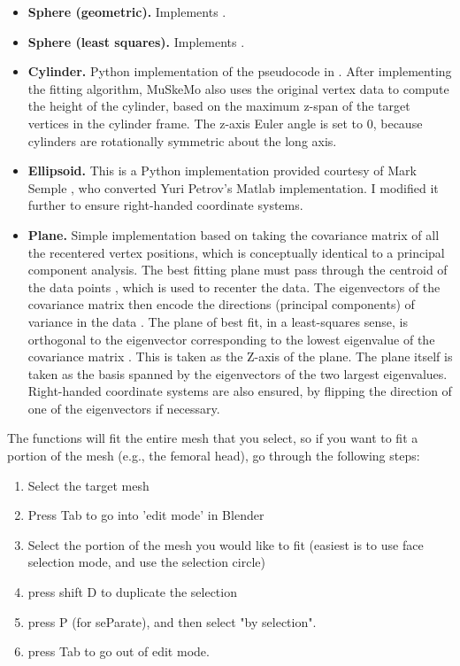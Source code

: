 \documentclass{article}
\begin{document}
\begin{itemize}
    \item \textbf{Sphere (geometric).} Implements \cite{yesudasanFastGeometricFit2015}.
    \item \textbf{Sphere (least squares).} Implements \cite{Jekel2016}.
    \item \textbf{Cylinder.} Python implementation of the pseudocode in \cite{eberlyLeastSquaresFitting}. After implementing the fitting algorithm, MuSkeMo also uses the original vertex data to compute the height of the cylinder, based on the maximum z-span of the target vertices in the cylinder frame. The z-axis Euler angle is set to 0, because cylinders are rotationally symmetric about the long axis.
    \item \textbf{Ellipsoid.} This is a Python implementation provided courtesy of Mark Semple \cite{semplePyEllipsoid_Fit}, who converted Yuri Petrov's Matlab implementation. I modified it further to ensure right-handed coordinate systems.
    \item \textbf{Plane.} Simple implementation based on taking the covariance matrix of all the recentered vertex positions, which is conceptually identical to a principal component analysis. The best fitting plane must pass through the centroid of the data points \cite{pearsonLIIILinesPlanes1901}, which is used to recenter the data. The eigenvectors of the covariance matrix then encode the directions (principal components) of variance in the data \cite{jolliffeMathematicalStatisticalProperties2002}. The plane of best fit, in a least-squares sense, is orthogonal to the eigenvector corresponding to the lowest eigenvalue of the covariance matrix \cite{jolliffeMathematicalStatisticalProperties2002,pearsonLIIILinesPlanes1901}. This is taken as the Z-axis of the plane. The plane itself is taken as the basis spanned by the eigenvectors of the two largest eigenvalues. Right-handed coordinate systems are also ensured, by flipping the direction of one of the eigenvectors if necessary.
\end{itemize}

The functions will fit the entire mesh that you select, so if you want to fit a portion of the mesh (e.g., the femoral head), go through the following steps:


\begin{enumerate}
\item Select the target mesh
\item Press Tab to go into 'edit mode' in Blender
\item Select the portion of the mesh you would like to fit (easiest is to use face selection mode, and use the selection circle)
\item press shift \+ D to duplicate the selection
\item press P (for seParate), and then select "by selection".
\item press Tab to go out of edit mode.
\end{enumerate}
\end{document}
